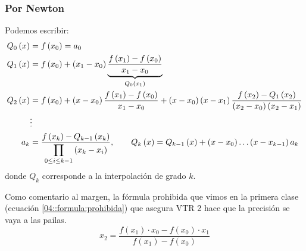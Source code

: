 \documentclass[english, spanish, fleqn, 10pt]{article}
\numberwithin{equation}{section}
\newcommand{\nparentesis}[1]{\left( #1 \right)}
\theoremstyle{definition}
\begin{document}
\subsubsection{Por Newton}
Podemos escribir:
\begin{align*}
Q_0\nparentesis{x}&=f\nparentesis{x_0}=a_0\\
Q_1\nparentesis{x}&=f\nparentesis{x_0}+\nparentesis{x_1-x_0}\underbrace{\dfrac{f\nparentesis{x_1}-f\nparentesis{x_0}}{x_1-x_0}}_{Q_0\nparentesis{x_1}}\\
Q_2\nparentesis{x}&=f\nparentesis{x_0}+\nparentesis{x-x_0}\dfrac{f\nparentesis{x_1}-f\nparentesis{x_0}}{x_1-x_0}+\nparentesis{x-x_0}\nparentesis{x-x_1}\dfrac{f\nparentesis{x_2}-Q_1\nparentesis{x_2}}{\nparentesis{x_2-x_0}\nparentesis{x_2-x_1}}\\
&\vdots\\
a_k&=\dfrac{f\nparentesis{x_k}-Q_{k-1}\nparentesis{x_k}}{\mathlarger\prod_{0\leq i\leq k-1}\nparentesis{x_k-x_i}}, \qquad Q_k\nparentesis{x}=Q_{k-1}\nparentesis{x}+\nparentesis{x-x_0}\ldots\nparentesis{x-x_{k-1}}a_k
\end{align*}
donde $Q_k$ corresponde a la interpolación de grado $k$.


Como comentario al margen, la fórmula prohibida que vimos en la primera clase (ecuación \eqref{04::formula:prohibida}) que asegura VTR 2 hace que la precisión se vaya a las pailas.
\begin{equation}\label{04::formula:prohibida}
x_2=\dfrac{f\nparentesis{x_1}\cdot x_0-f\nparentesis{x_0}\cdot x_1}{f\nparentesis{x_1}-f\nparentesis{x_0}}
\end{equation}
\end{document}
